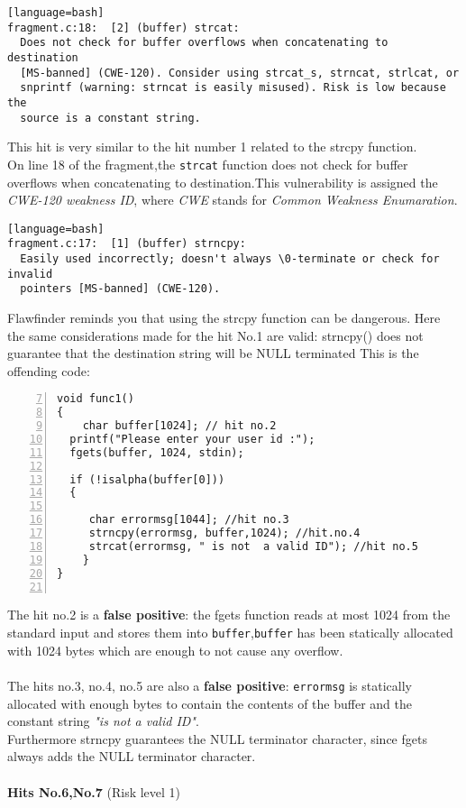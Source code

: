 \documentclass[a4paper,12pt]{article}
\begin{document}
\begin{lstlisting}[style=DOS][language=bash]
fragment.c:18:  [2] (buffer) strcat:
  Does not check for buffer overflows when concatenating to destination
  [MS-banned] (CWE-120). Consider using strcat_s, strncat, strlcat, or
  snprintf (warning: strncat is easily misused). Risk is low because the
  source is a constant string.
\end{lstlisting}
This hit is very similar to the hit number 1 related to the strcpy function.\\
On line 18 of the fragment,the \texttt{strcat} function does not check for buffer overflows when concatenating to destination.This vulnerability is assigned the \textit{CWE-120 weakness ID}, where \textit{CWE} stands for \textit{Common Weakness Enumaration}\cite{CWE}.\\
\begin{lstlisting}[style=DOS][language=bash]
fragment.c:17:  [1] (buffer) strncpy:
  Easily used incorrectly; doesn't always \0-terminate or check for invalid
  pointers [MS-banned] (CWE-120).
\end{lstlisting}
Flawfinder reminds you that using the strcpy function can be dangerous.
Here the same considerations made for the hit No.1 are valid: strncpy() does not guarantee that the destination string will be NULL terminated \cite{geeksstrcpy}
\newpage
This is the offending code:
\begin{lstlisting}[style=c,numbers=left,firstnumber=7,linebackgroundcolor={
\ifnum\value{lstnumber}=9\color{green}\fi
\ifnum\value{lstnumber}=16\color{green}\fi
\ifnum\value{lstnumber}=17\color{green}\fi
\ifnum\value{lstnumber}=18\color{green}\fi}]
void func1()
{	
	char buffer[1024]; // hit no.2
  printf("Please enter your user id :");
  fgets(buffer, 1024, stdin);
 
  if (!isalpha(buffer[0]))
  {

     char errormsg[1044]; //hit no.3
     strncpy(errormsg, buffer,1024); //hit.no.4
     strcat(errormsg, " is not  a valid ID"); //hit no.5
 	}
}


\end{lstlisting}
The hit no.2 is a \textbf{false positive}: the fgets function reads at most 1024 from the standard input and stores them into \texttt{buffer},\texttt{buffer} has been statically allocated with 1024 bytes which are enough to not cause any overflow.\\\\
The hits no.3, no.4, no.5 are also a \textbf{false positive}: \texttt{errormsg} is statically allocated with enough bytes to contain the contents of the buffer and the constant string \textit{"is not  a valid ID"}.\\
Furthermore strncpy guarantees the NULL terminator character, since fgets always adds the NULL terminator character.
\\
\\
\textbf{Hits No.6,No.7} (Risk level 1)
\end{document}
